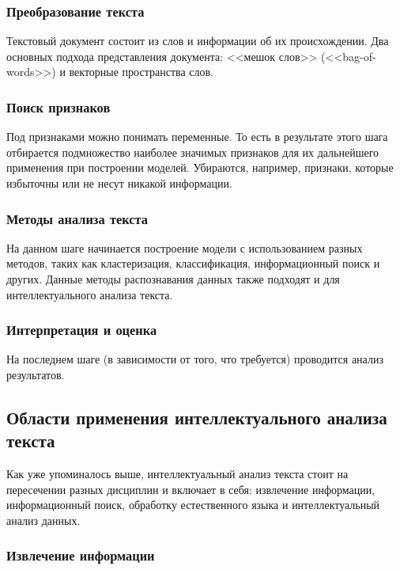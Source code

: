 \documentclass[14pt]{matmex-diploma-custom}
\begin{document}
\subsubsection{Преобразование текста}

Текстовый документ состоит из слов и информации об их происхождении. Два основных подхода представления документа: <<мешок слов>> (<<bag-of-words>>) и векторные пространства слов.

\subsubsection{Поиск признаков}

Под признаками можно понимать переменные. То есть в результате этого шага отбирается подмножество наиболее значимых признаков для их дальнейшего применения при построении моделей. Убираются, например, признаки, которые избыточны или не несут никакой информации.

\subsubsection{Методы анализа текста}

На данном шаге начинается построение модели с использованием разных методов, таких как кластеризация, классификация, информационный поиск и других. Данные методы распознавания данных также подходят и для интеллектуального анализа текста.

\subsubsection{Интерпретация и оценка}

На последнем шаге (в зависимости от того, что требуется) проводится анализ результатов.

\subsection{Области применения интеллектуального анализа текста}

Как уже упоминалось выше, интеллектуальный анализ текста стоит на пересечении разных дисциплин и включает в себя: извлечение информации, информационный поиск, обработку естественного языка и интеллектуальный анализ данных.

\subsubsection{Извлечение информации}
\end{document}

